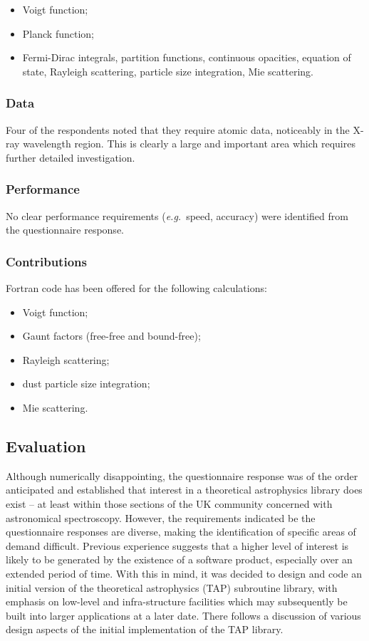 \begin {itemize}
\item Voigt function;
\item Planck function;
\item Fermi-Dirac integrals, partition functions, continuous opacities,
equation of state, Rayleigh scattering, particle size integration, Mie
scattering.
\end {itemize}


\subsubsection {Data}
Four of the respondents noted that they require atomic data, noticeably in
the X-ray wavelength region.
This is clearly a large and important area which requires further
detailed investigation.

\subsubsection {Performance}
No clear performance requirements ({\em e.g.}\ speed, accuracy) were
identified from the questionnaire response.

\subsubsection {Contributions}
Fortran code has been offered for the following calculations:

\begin {itemize}
\item Voigt function;
\item Gaunt factors (free-free and bound-free);
\item Rayleigh scattering;
\item dust particle size integration;
\item Mie scattering.
\end {itemize}

\subsection {Evaluation}

Although numerically disappointing, the questionnaire response was of the order
anticipated and established that interest in a theoretical astrophysics
library does exist -- at least within those sections of the UK community
concerned with astronomical spectroscopy.
However, the requirements indicated be the questionnaire responses
are diverse, making the identification of specific areas of demand difficult.
Previous experience suggests that a higher level of interest is likely to be
generated by the existence of a software product, especially over an extended
period of time.
With this in mind, it was decided to design and code an initial version of
the theoretical astrophysics (TAP) subroutine library, with emphasis on
low-level and infra-structure facilities which may subsequently be built
into larger applications at a later date.
There follows a discussion of various design aspects of the initial
implementation of the TAP library.

